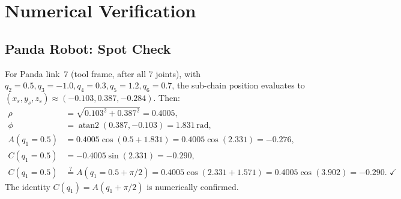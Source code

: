 \documentclass[11pt,a4paper]{article}
\DeclareMathOperator{\atantwo}{atan2}
\begin{document}
\appendix
\section{Numerical Verification}\label{app:numerical}

\subsection{Panda Robot: Spot Check}

For Panda link~7 (tool frame, after all 7 joints), with
$q_2=0.5, q_3=-1.0, q_4=0.3, q_5=1.2, q_6=0.7$, the sub-chain
position evaluates to $(x_s, y_s, z_s) \approx (-0.103, 0.387, -0.284)$.
Then:
\begin{align*}
  \rho &= \sqrt{0.103^2 + 0.387^2} = 0.4005, \\
  \phi &= \atantwo(0.387, -0.103) = 1.831\,\text{rad}, \\
  A(q_1=0.5) &= 0.4005\cos(0.5+1.831) = 0.4005\cos(2.331) = -0.276, \\
  C(q_1=0.5) &= -0.4005\sin(2.331) = -0.290, \\
  C(q_1=0.5) &\stackrel{?}{=} A(q_1=0.5+\pi/2) = 0.4005\cos(2.331+1.571) = 0.4005\cos(3.902) = -0.290. \;\checkmark
\end{align*}
The identity $C(q_1) = A(q_1+\pi/2)$ is numerically confirmed.
\end{document}
